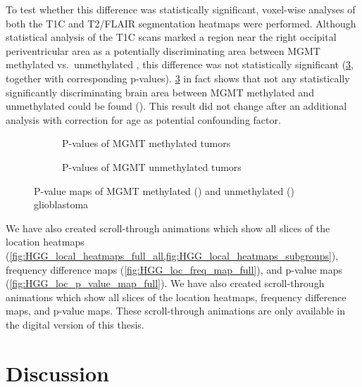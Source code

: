 To test whether this difference was statistically significant, voxel-wise analyses of both the \gls{T1C} and \gls{T2}/\gls{FLAIR} segmentation heatmaps were performed.
Although statistical analysis of the \gls{T1C} scans marked a region near the right occipital periventricular area as a potentially discriminating area between \gls{MGMT} methylated vs.\ unmethylated , this difference was not statistically significant (\cref{fig:HGG_location_pvalue_map}, together with corresponding p-values).
\cref{fig:HGG_location_pvalue_map} in fact shows that not any statistically significantly discriminating brain area between \gls{MGMT} methylated and unmethylated  could be found ().
This result did not change after an additional analysis with correction for age as potential confounding factor.

\begin{figure}[htbp]
    \centering
    \begin{subfigure}[b]{\textwidth}
        \centering
        \caption{P-values of \gls{MGMT} methylated \glspl{tumor}}\label{fig:HGG_location_pvalue_methylated}
    \end{subfigure}
    \begin{subfigure}[b]{\textwidth}
        \centering
        \caption{P-values of \gls{MGMT} unmethylated \glspl{tumor}}\label{fig:HGG_location_pvalue_unmethylated}
    \end{subfigure}
    \caption{P-value maps of \acrshort{MGMT} methylated () and unmethylated () glioblastoma}\label{fig:HGG_location_pvalue_map}
\end{figure}

\ifdigital
    We have also created scroll-through animations which show all slices of the location heatmaps (\cref{fig:HGG_local_heatmaps_full_all,fig:HGG_local_heatmaps_subgroups}), frequency difference maps (\cref{fig:HGG_loc_freq_map_full}), and p-value maps (\cref{fig:HGG_loc_p_value_map_full}).
\else
    We have also created scroll-through animations which show all slices of the location heatmaps, frequency difference maps, and p-value maps. These scroll-through animations are only available in the digital version of this thesis.
\fi


\section{Discussion}

